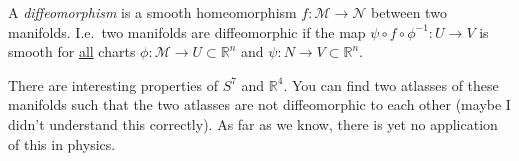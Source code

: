 \begin{definition}[Diffeomorphism]
  A \emph{diffeomorphism} is a smooth homeomorphism $f: \mathcal{M} \to \mathcal{N}$ between two manifolds.
  I.e.~two manifolds are diffeomorphic if the map $\psi \circ f \circ \phi^{-1}: U \to V$ is smooth for \underline{all} charts $\phi: \mathcal{M} \to U \subset \mathbb{R}^n$ and $\psi: N \to V \subset \mathbb{R}^n$.
\end{definition}

\begin{leftbar}
  \begin{remark}
    There are interesting properties of $S^7$ and $\mathbb{R}^{4}$. You can find two atlasses of these manifolds such that the two atlasses are not diffeomorphic to each other (maybe I didn't understand this correctly).
    As far as we know, there is yet no application of this in physics.
  \end{remark}
\end{leftbar}






